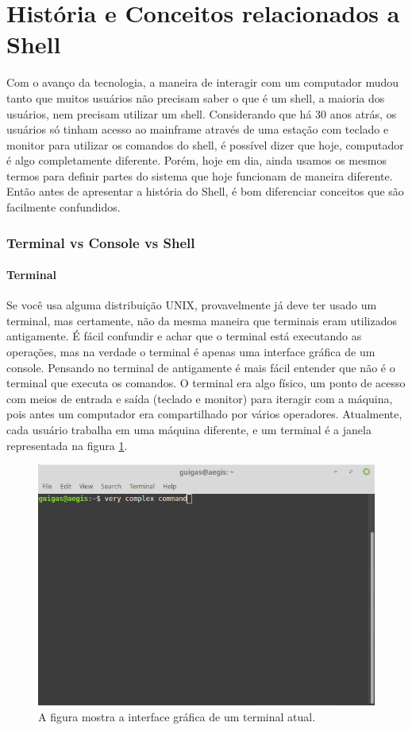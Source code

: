 \documentclass[oneside, 11 pt]{article}
\begin{document}
	\newpage
	\part{História e Conceitos relacionados a Shell}
	
	Com o avanço da tecnologia, a maneira de interagir com um computador mudou tanto que muitos usuários não precisam saber o que é um shell, a maioria dos usuários, nem precisam utilizar um shell.
	Considerando que há 30 anos atrás, os usuários só tinham acesso ao mainframe através de uma estação com teclado e monitor para utilizar os comandos do shell, é possível dizer que hoje, computador é algo completamente diferente. Porém, hoje em dia, ainda usamos os mesmos termos para definir partes do sistema que hoje funcionam de maneira diferente. Então antes de apresentar a história do Shell, é bom diferenciar conceitos que são facilmente confundidos.
	
	\section{Terminal vs Console vs Shell}
	
	\subsection{Terminal}
	Se você usa alguma distribuição UNIX, provavelmente já deve ter usado um terminal, mas certamente, não da mesma maneira que terminais eram utilizados antigamente. É fácil confundir e achar que o terminal está executando as operações, mas na verdade o terminal é apenas uma interface gráfica de um console. Pensando no terminal de antigamente é mais fácil entender que não é o terminal que executa os comandos. O terminal era algo físico, um ponto de acesso com meios de entrada e saída (teclado e monitor) para iteragir com a máquina, pois antes um computador era compartilhado por vários operadores.
	Atualmente, cada usuário trabalha em uma máquina diferente, e um terminal é a janela representada na figura \ref*{fig:term1}.
	\begin{figure}[h]
		\includegraphics[width=\linewidth]{term2.png}
		\caption{A figura mostra a interface gráfica de um terminal atual.}
		\label{fig:term1}
	\end{figure}
\end{document}
